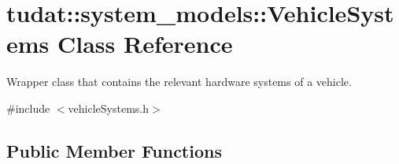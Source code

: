 \hypertarget{classtudat_1_1system__models_1_1VehicleSystems}{}\section{tudat\+:\+:system\+\_\+models\+:\+:Vehicle\+Systems Class Reference}
\label{classtudat_1_1system__models_1_1VehicleSystems}


Wrapper class that contains the relevant hardware systems of a vehicle.  




{\ttfamily \#include $<$vehicle\+Systems.\+h$>$}

\subsection*{Public Member Functions}
